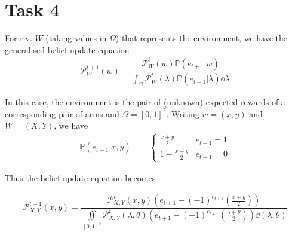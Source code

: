 \section*{Task 4}

For r.v. $W$ (taking values in $\Omega$) that represents the environment, we have the generalised belief update equation
\begin{align*}
    \mathcal{P}_W^{t + 1}(w) = \dfrac{\mathcal{P}_W^{t}(w)\mathbb{P}(e_{t+1} | w)}{\int_\Omega\mathcal{P}_W^{t}(\lambda)\mathbb{P}(e_{t+1} | \lambda)\dd\lambda}
\end{align*}

In this case, the environment is the pair of (unknown) expected rewards of a corresponding pair of arms and $\Omega=[0,1]^2$. Writing $w = (x,y)$ and $W=(X,Y)$, we have
\begin{align*}
    \mathbb{P}(e_{t + 1} | x, y) &= \begin{cases}
        \tfrac{x + y}{2} & e_{t+1} = 1 \\
        1 - \tfrac{x + y}{2} & e_{t+1} = 0
    \end{cases}
\end{align*}

Thus the belief update equation becomes

\begin{align*}
    \mathcal{P}_{X,Y}^{t + 1}(x, y) = \dfrac{\mathcal{P}_{X,Y}^t(x,y)\left(e_{t+1} - (-1)^{e_{t+1}}\left(\tfrac{x + y}{2}\right)\right)}{\iint\limits_{[0,1]^2}\mathcal{P}_{X,Y}^t(\lambda,\theta)\left(e_{t+1} - (-1)^{e_{t+1}}\left(\tfrac{\lambda + \theta}{2}\right)\right)\dd(\lambda,\theta)}
\end{align*}

